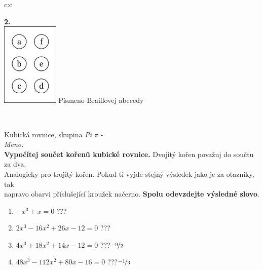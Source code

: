 \documentclass[10pt]{report}
\begin{document}
\begin{tabular}{c:c}
\begin{minipage}[c][99mm][t]{0.49\linewidth}
\begin{center}
\begin{minipage}{0.77\linewidth}
\begin{center}
\end{center}
\end{minipage}
\begin{minipage}{0.20\linewidth}
\begin{center}
{\Huge\bfseries 2.} \\[2mm]
\includegraphics[height=40mm]{../images/braille.png}
{\small Písmeno Braillovej abecedy}
\end{center}
\end{minipage}
\end{center}
\end{minipage}
\\ \hdashline
\begin{minipage}[c][99mm][t]{0.49\linewidth}
\begin{center}
\vspace{7mm}
{\huge Kubická rovnice, skupina \textit{Pi $\pi$} -}\\[4.5mm]
\textit{Meno:}\phantom{xxxxxxxxxxxxxxxxxxxxxxxxxxxxxxxxxxxxxxxxxxxxxxxxxxxxxxxxxxxxxxxxx}\\[3.5mm]
\textbf{Vypočítej součet kořenů kubické rovnice.} Dvojitý kořen považuj do součtu za dva.\\Analogicky pro trojitý kořen. Pokud ti vyjde stejný výsledek jako je za otazníky, tak\\napravo obarvi příslušející kroužek načerno. \textbf{Spolu odevzdejte výsledné slovo}.\\[3mm]
\begin{minipage}{0.77\linewidth}
\begin{center}
\begin{varwidth}{\textwidth}
\begin{enumerate}
\large
\item $-x^3+x=0$\quad \dotfill\; ???\;\dotfill {}
\item $2x^3-16x^2+26x-12=0$\quad \dotfill\; ???\;\dotfill {}
\item $4x^3+18x^2+14x-12=0$\quad \dotfill\; ???\;\dotfill \quad $\nicefrac{-9}{2}$
\item $48x^3-112x^2+80x-16=0$\quad \dotfill\; ???\;\dotfill \quad $\nicefrac{-1}{3}$

\end{enumerate}
\end{varwidth}
\end{center}
\end{minipage}
\end{center}
\end{minipage}
\end{tabular}
\end{document}

